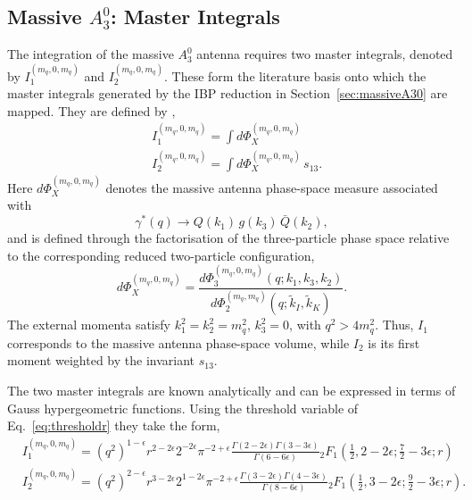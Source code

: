 \subsection{Massive $A_3^0$: Master Integrals}\label{subsec:massiveMI}

The integration of the massive $A_3^0$ antenna requires two master integrals, denoted by
$I_1^{(m_q,0,m_q)}$ and $I_2^{(m_q,0,m_q)}$. These form the literature basis onto which the
master integrals generated by the IBP reduction in Section~\ref{sec:massiveA30} are mapped. They
are defined by \cite{GehrmannDeRidder:2009fz},
\begin{equation}
    \begin{split}
        &I_1^{(m_q,0,m_q)} = \int d\Phi_X^{(m_q,0,m_q)}\\
        &I_2^{(m_q,0,m_q)} = \int d\Phi_X^{(m_q,0,m_q)}\,s_{13}.
    \end{split}
\end{equation}
Here $d\Phi_X^{(m_q,0,m_q)}$ denotes the massive antenna phase-space measure associated with
\begin{equation*}
    \gamma^*(q)\rightarrow Q(k_1)\,g(k_3)\,\bar Q(k_2),
\end{equation*}
and is defined through the factorisation of the three-particle phase space relative to the
corresponding reduced two-particle configuration,
\begin{equation}
    d\Phi_X^{(m_q,0,m_q)} = \frac{d\Phi_3^{(m_q,0,m_q)}(q;k_1,k_3,k_2)}{d\Phi_2^{(m_q,m_q)}(q;\tilde k_I, \tilde k_K)}.
\end{equation}
The external momenta satisfy $k_1^2=k_2^2=m_q^2$, $k_3^2=0$, with $q^2>4m_q^2$. Thus, $I_1$
corresponds to the massive antenna phase-space volume, while $I_2$ is its first moment weighted
by the invariant $s_{13}$.

The two master integrals are known analytically \cite{GehrmannDeRidder:2009fz} and can be
expressed in terms of Gauss hypergeometric functions. Using the threshold variable of
Eq.~\eqref{eq:thresholdr} they take the form,
\begin{equation}
    \begin{split}
        &I_1^{(m_q,0,m_q)} = \left(q^2\right)^{1-\epsilon}r^{2-2\epsilon}2^{-2\epsilon}\pi^{-2+\epsilon}\frac{\Gamma(2-2\epsilon)\Gamma(3-3\epsilon)}{\Gamma(6-6\epsilon)}{}_2F_1\!\left(\frac12,2-2\epsilon;\frac72-3\epsilon;r\right)\\
        &I_2^{(m_q,0,m_q)} = \left(q^2\right)^{2-\epsilon}r^{3-2\epsilon}2^{1-2\epsilon}\pi^{-2+\epsilon}\frac{\Gamma(3-2\epsilon)\Gamma(4-3\epsilon)}{\Gamma(8-6\epsilon)}{}_2F_1\!\left(\frac12,3-2\epsilon;\frac92-3\epsilon;r\right).
    \end{split}
\end{equation}

